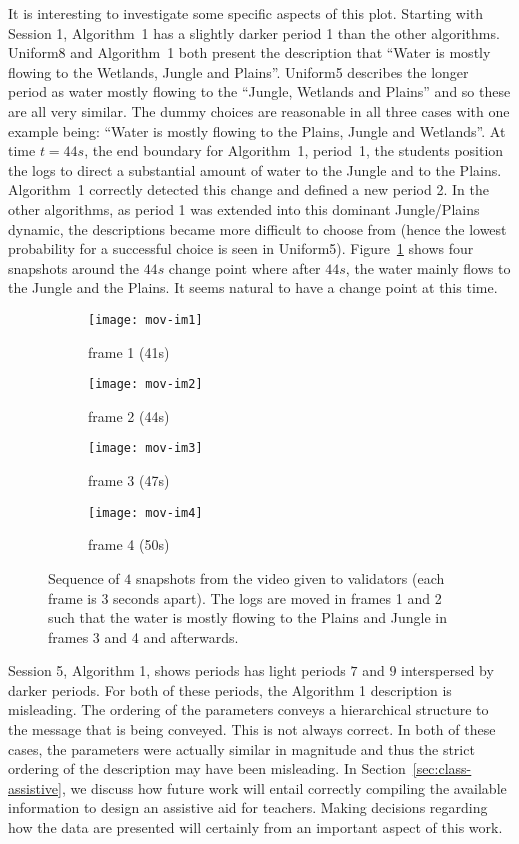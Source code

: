 \begin{appendices}
It is interesting to investigate some specific aspects of this plot. Starting with Session 1, Algorithm~1 has a slightly darker period 1 than the other algorithms. Uniform8 and Algorithm~1 both present the description that ``Water is mostly flowing to the Wetlands, Jungle and Plains''. Uniform5 describes the longer period as water mostly flowing to the ``Jungle, Wetlands and Plains'' and so these are all very similar. The dummy choices are reasonable in all three cases with one example being: ``Water is mostly flowing to the Plains, Jungle and Wetlands''. At time $t=44s$, the end boundary for Algorithm~1, period~1, the students position the logs to direct a substantial amount of water to the Jungle and to the Plains. Algorithm~1 correctly detected this change and defined a new period 2. In the other algorithms, as period 1 was extended into this dominant Jungle/Plains dynamic, the descriptions became more difficult to choose from (hence the lowest probability for a successful choice is seen in Uniform5). Figure~\ref{fig:test} shows four snapshots around the $44s$ change point where after $44s$, the water mainly flows to the Jungle and the Plains. It seems natural to have a change point at this time.

\begin{figure}
\centering
\begin{subfigure}{.24\textwidth}
  \centering
  \texttt{[image: mov-im1]}
  \caption{frame 1 (41s)}
\end{subfigure}%
\begin{subfigure}{.24\textwidth}
  \centering
  \texttt{[image: mov-im2]}
  \caption{frame 2 (44s)}
\end{subfigure}
\begin{subfigure}{.24\textwidth}
  \centering
  \texttt{[image: mov-im3]}
  \caption{frame 3 (47s)}
\end{subfigure}
\begin{subfigure}{.24\textwidth}
  \centering
  \texttt{[image: mov-im4]}
  \caption{frame 4 (50s)}
\end{subfigure}
\caption{Sequence of $4$ snapshots from the video given to validators (each frame is 3 seconds apart). The logs are moved in frames 1 and 2 such that the water is mostly flowing to the Plains and Jungle in frames 3 and 4 and afterwards.}
\label{fig:test}
\end{figure}

Session 5, Algorithm 1, shows periods has light periods $7$ and $9$ interspersed by darker periods. For both of these periods, the Algorithm 1 description is misleading. The ordering of the parameters conveys a hierarchical structure to the message that is being conveyed. This is not always correct. In both of these cases, the parameters were actually similar in magnitude and thus the strict ordering of the description may have been misleading. In Section~\ref{sec:class-assistive}, we discuss how future work will entail correctly compiling the available information to design an assistive aid for teachers. Making decisions regarding how the data are presented will certainly from an important aspect of this work.


\end{appendices}
